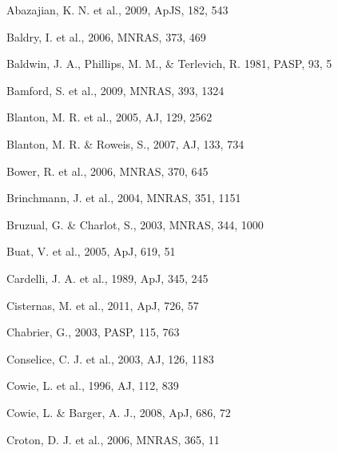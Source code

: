 \documentclass[useAMS,usenatbib]{mn2e}
\begin{document}
\begin{thebibliography}{}

 Abazajian, K. N. et al., 2009, ApJS, 182, 543

 Baldry, I. et al., 2006, MNRAS, 373, 469

 Baldwin, J. A., Phillips, M. M., \& Terlevich, R. 1981, PASP, 93, 5

 Bamford, S. et al., 2009, MNRAS, 393, 1324

 Blanton, M. R. et al., 2005, AJ, 129, 2562

 Blanton, M. R. \& Roweis, S., 2007, AJ, 133, 734

 Bower, R. et al., 2006, MNRAS, 370, 645

 Brinchmann, J. et al., 2004, MNRAS, 351, 1151

 Bruzual, G. \& Charlot, S., 2003, MNRAS, 344, 1000

 Buat, V. et al., 2005, ApJ, 619, 51

 Cardelli, J. A. et al., 1989, ApJ, 345, 245

 Cisternas, M. et al., 2011, ApJ, 726, 57

 Chabrier, G., 2003, PASP, 115, 763

 Conselice, C. J. et al., 2003, AJ, 126, 1183

 Cowie, L. et al., 1996, AJ, 112, 839

 Cowie, L. \& Barger, A. J., 2008, ApJ, 686, 72

 Croton, D. J. et al., 2006, MNRAS, 365, 11


\end{thebibliography}
\end{document}
